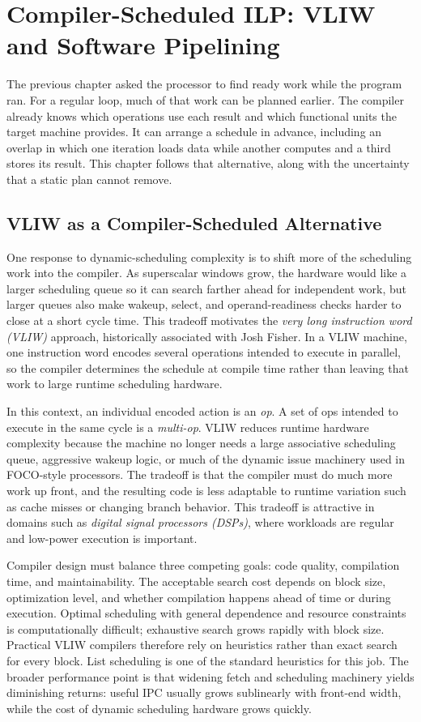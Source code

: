 \chapter[Compiler-Scheduled ILP]{Compiler-Scheduled ILP: VLIW and Software Pipelining}\label{ch:compiler-scheduled-ilp}

The previous chapter asked the processor to find ready work while the program ran.
For a regular loop, much of that work can be planned earlier.
The compiler already knows which operations use each result and which functional units the target machine provides.
It can arrange a schedule in advance, including an overlap in which one iteration loads data while another computes and a third stores its result.
This chapter follows that alternative, along with the uncertainty that a static plan cannot remove.


\section{VLIW as a Compiler-Scheduled Alternative}\label{sec:ilp-vliw}
One response to dynamic-scheduling complexity is to shift more of the scheduling work into the compiler.
As superscalar windows grow, the hardware would like a larger scheduling queue so it can search farther ahead for independent work, but larger queues also make wakeup, select, and operand-readiness checks harder to close at a short cycle time.
This tradeoff motivates the \textit{very long instruction word (VLIW)} approach, historically associated with Josh Fisher.
In a VLIW machine, one instruction word encodes several operations intended to execute in parallel, so the compiler determines the schedule at compile time rather than leaving that work to large runtime scheduling hardware.

In this context, an individual encoded action is an \textit{op}.
A set of ops intended to execute in the same cycle is a \textit{multi-op}.
VLIW reduces runtime hardware complexity because the machine no longer needs a large associative scheduling queue, aggressive wakeup logic, or much of the dynamic issue machinery used in FOCO-style processors.
The tradeoff is that the compiler must do much more work up front, and the resulting code is less adaptable to runtime variation such as cache misses or changing branch behavior.
This tradeoff is attractive in domains such as \textit{digital signal processors (DSPs)}, where workloads are regular and low-power execution is important.

Compiler design must balance three competing goals: code quality, compilation time, and maintainability.
The acceptable search cost depends on block size, optimization level, and whether compilation happens ahead of time or during execution.
Optimal scheduling with general dependence and resource constraints is computationally difficult; exhaustive search grows rapidly with block size.
Practical VLIW compilers therefore rely on heuristics rather than exact search for every block.
List scheduling is one of the standard heuristics for this job.
The broader performance point is that widening fetch and scheduling machinery yields diminishing returns: useful IPC usually grows sublinearly with front-end width, while the cost of dynamic scheduling hardware grows quickly.


